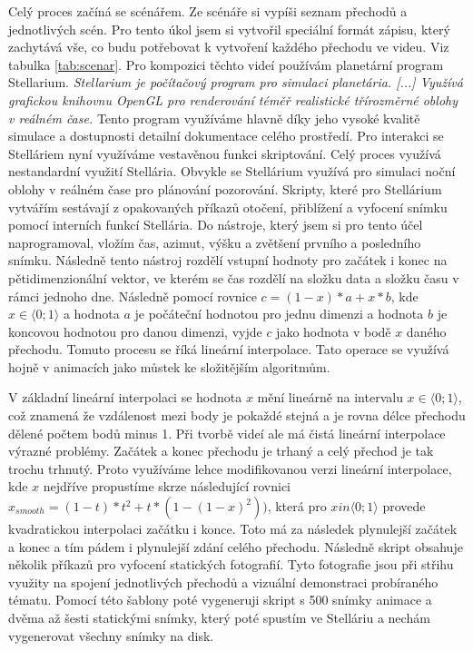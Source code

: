 \documentclass[12pt,a4paper,titlepage]{article}
\begin{document}
Celý proces začíná se scénářem. Ze scénáře si vypíši seznam přechodů a jednotlivých scén. Pro tento úkol jsem si vytvořil speciální formát zápisu, který zachytává vše, co budu potřebovat k vytvoření každého přechodu ve videu. Viz tabulka \ref{tab:scenar}. 
Pro kompozici těchto videí používám planetární program Stellarium. \textit{Stellarium je počítačový program pro simulaci planetária. [...] Využívá grafickou knihovnu OpenGL pro renderování téměř realistické třírozměrné oblohy v reálném čase.}  Tento program využíváme hlavně díky jeho vysoké kvalitě simulace a dostupnosti detailní dokumentace celého prostředí. Pro interakci se Stelláriem nyní využíváme vestavěnou funkci skriptování. Celý proces využívá nestandardní využití Stellária. Obvykle se Stellárium využívá pro simulaci noční oblohy v reálném čase pro plánování pozorování. Skripty, které pro Stellárium vytvářím sestávají z opakovaných příkazů otočení, přiblížení a vyfocení snímku pomocí interních funkcí Stellária. Do nástroje, který jsem si pro tento účel naprogramoval, vložím čas, azimut, výšku a zvětšení prvního a posledního snímku. Následně tento nástroj rozdělí vstupní hodnoty pro začátek i konec na pětidimenzionální vektor, ve kterém se čas rozdělí na složku data a složku času v rámci jednoho dne. Následně pomocí rovnice $c = (1-x)*a + x * b$, kde $x \in \langle0;1\rangle$ a hodnota $a$ je počáteční hodnotou pro jednu dimenzi a hodnota $b$ je koncovou hodnotou pro danou dimenzi, vyjde $c$ jako hodnota v bodě $x$ daného přechodu. Tomuto procesu se říká lineární interpolace. Tato operace se využívá hojně v animacích jako můstek ke složitějším algoritmům. 

V základní lineární interpolaci se hodnota $x$ mění lineárně na intervalu $x \in \langle0;1\rangle$, což znamená že vzdálenost mezi body je pokaždé stejná a je rovna délce přechodu dělené počtem bodů minus 1. Při tvorbě videí ale má čistá lineární interpolace výrazné problémy. Začátek a konec přechodu je trhaný a celý přechod je tak trochu trhnutý. Proto využíváme lehce modifikovanou verzi lineární interpolace, kde $x$ nejdříve propustíme skrze následující rovnici $x_{smooth} = (1 - t) * t^2 + t * (1-(1-x)^2))$, která pro $x in \langle0;1\rangle$ provede kvadratickou interpolaci začátku i konce. Toto má za následek plynulejší začátek a konec a tím pádem i plynulejší zdání celého přechodu. Následně skript obsahuje několik příkazů pro vyfocení statických fotografií. Tyto fotografie jsou při střihu využity na spojení jednotlivých přechodů a vizuální demonstraci probíraného tématu. Pomocí této šablony poté vygeneruji skript s 500 snímky animace a dvěma až šesti statickými snímky, který poté spustím ve Stelláriu a nechám vygenerovat všechny snímky na disk.
\end{document}
